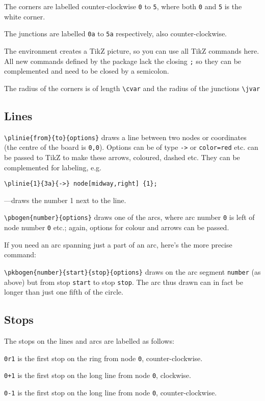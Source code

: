 \documentclass[a5paper]{scrartcl}
\begin{document}
The corners are labelled counter-clockwise \verb|0| to \verb|5|, where both \verb|0| and \verb|5| is the white corner.  

The junctions are labelled \verb|0a| to \verb|5a| respectively, also counter-clockwise.

The environment creates a TikZ picture, so you can use all TikZ commands here. All new commands defined by the package lack the closing \verb|;| so they can be complemented and need to be closed by a semicolon. 

The radius of the corners is of length \verb|\cvar| and the radius of the junctions \verb|\jvar|

\subsection*{Lines}

\verb|\plinie{from}{to}{options}| draws a line between two nodes or coordinates (the centre of the board is \verb|0,0|). Options can be of type \verb|->| or \verb|color=red| etc. can be passed to TikZ to make these arrows, coloured, dashed etc. They can be complemented for labeling, e.g.

\verb|\plinie{1}{3a}{->} node[midway,right] {1};|

---draws the number 1 next to the line.

\verb|\pbogen{number}{options}| draws one of the arcs, where arc number \verb|0| is left of node number \verb|0| etc.; again, options for colour and arrows can be passed. 

If you need an arc spanning just a part of an arc, here's the more precise command:

\verb|\pkbogen{number}{start}{stop}{options}| draws on the arc segment \verb|number| (as above) but from stop \verb|start| to stop  \verb|stop|. The arc thus drawn can in fact be longer than just one fifth of the circle. 

\subsection*{Stops}

The stops on the lines and arcs are labelled as follows:

\verb|0r1| is the first stop on the ring from node \verb|0|, counter-clockwise.
    
\verb|0+1| is the first stop on the long line from node \verb|0|, clockwise.
    
\verb|0-1| is the first stop on the long line from node \verb|0|, counter-clockwise.
    
\end{document}
